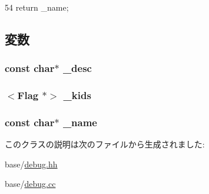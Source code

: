 \begin{DoxyCode}
54 { return _name; }
\end{DoxyCode}


\subsection{変数}
\hypertarget{classDebug_1_1Flag_a60e3e00f42fae1b70b695597f995b2c8}{
\subsubsection[{\_\-desc}]{\setlength{\rightskip}{0pt plus 5cm}const char$\ast$ {\bf \_\-desc}}}
\label{classDebug_1_1Flag_a60e3e00f42fae1b70b695597f995b2c8}
\hypertarget{classDebug_1_1Flag_a1b28d3bf67f3b06a88ecd9ac7b0a7ec9}{
\subsubsection[{\_\-kids}]{$<${\bf Flag} $\ast$$>$ {\bf \_\-kids}}}
\label{classDebug_1_1Flag_a1b28d3bf67f3b06a88ecd9ac7b0a7ec9}
\hypertarget{classDebug_1_1Flag_aa1e4a2a162e6a7cc058b96cea960135f}{
\subsubsection[{\_\-name}]{\setlength{\rightskip}{0pt plus 5cm}const char$\ast$ {\bf \_\-name}}}
\label{classDebug_1_1Flag_aa1e4a2a162e6a7cc058b96cea960135f}


このクラスの説明は次のファイルから生成されました:\begin{DoxyCompactItemize}
\item 
base/\hyperlink{base_2debug_8hh}{debug.hh}\item 
base/\hyperlink{base_2debug_8cc}{debug.cc}\end{DoxyCompactItemize}
